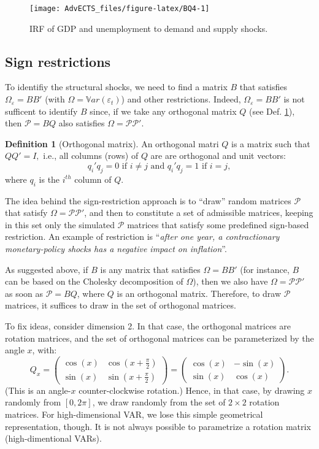 \documentclass[
]{book}
\theoremstyle{definition}
\newtheorem{definition}{Definition}[chapter]
\theoremstyle{definition}
\theoremstyle{definition}
\theoremstyle{definition}
\theoremstyle{remark}
\begin{document}
\begin{figure}
\texttt{[image: AdvECTS\_files/figure-latex/BQ4-1]} \caption{IRF of GDP and unemployment to demand and supply shocks.}\label{fig:BQ4}
\end{figure}

\hypertarget{Signs}{%
\subsection{Sign restrictions}\label{Signs}}

To identifiy the structural shocks, we need to find a matrix \(B\) that satisfies \(\Omega_{\varepsilon} = BB'\) (with \(\Omega = \mathbb{V}ar(\varepsilon_t)\)) and other restrictions. Indeed, \(\Omega_{\varepsilon} = BB'\) is not sufficent to identify \(B\) since, if we take any orthogonal matrix \(Q\) (see Def. \ref{def:orthogonal}), then \(\mathcal{P}=BQ\) also satisfies \(\Omega = \mathcal{P}\mathcal{P}'\).

\begin{definition}[Orthogonal matrix]
\protect\hypertarget{def:orthogonal}{}\label{def:orthogonal}An orthogonal matri \(Q\) is a matrix such that \(QQ' = I,\) i.e., all columns (rows) of \(Q\) are are
orthogonal and unit vectors:
\[q_i'q_j=0\text{ if }i\neq j\text{ and }q_i'q_j=1\text{ if }i= j,\]
where \(q_i\) is the \(i^{th}\) column of \(Q\).
\end{definition}

The idea behind the sign-restriction approach is to ``draw'' random matrices \(\mathcal{P}\) that satisfy \(\Omega = \mathcal{P}\mathcal{P}'\), and then to constitute a set of admissible matrices, keeping in this set only the simulated \(\mathcal{P}\) matrices that satisfy some predefined sign-based restriction. An example of restriction is ``\emph{after one year, a contractionary monetary-policy shocks has a negative impact on inflation}''.

As suggested above, if \(B\) is any matrix that satisfies \(\Omega = BB'\) (for instance, \(B\) can be based on the Cholesky decomposition of \(\Omega\)), then we also have \(\Omega = \mathcal{P}\mathcal{P}'\) as soon as \(\mathcal{P}=BQ\), where \(Q\) is an orthogonal matrix. Therefore, to draw \(\mathcal{P}\) matrices, it suffices to draw in the set of orthogonal matrices.

To fix ideas, consider dimension 2. In that case, the orthogonal matrices are rotation matrices, and the set of orthogonal matrices can be parameterized by the angle \(x\), with:
\[
Q_x=\begin{pmatrix}\cos(x)&\cos\left(x+\frac{\pi}{2}\right)\\
\sin(x)&\sin\left(x+\frac{\pi}{2}\right)\end{pmatrix}=\begin{pmatrix}\cos(x)&-\sin(x)\\
\sin(x)&\cos(x)\end{pmatrix}.
\]
(This is an angle-\(x\) counter-clockwise rotation.) Hence, in that case, by drawing \(x\) randomly from \([0,2\pi]\), we draw randomly from the set of \(2\times2\) rotation matrices. For high-dimensional VAR, we lose this simple geometrical representation, though. It is not always possible to parametrize a rotation matrix (high-dimentional VARs).
\end{document}
